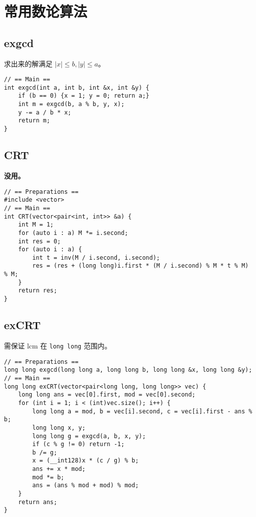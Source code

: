 \section{常用数论算法}

\subsection{exgcd}

求出来的解满足 $|x| \le b, |y| \le a$。

\begin{verbatim}
// == Main ==
int exgcd(int a, int b, int &x, int &y) {
    if (b == 0) {x = 1; y = 0; return a;}
    int m = exgcd(b, a % b, y, x);
    y -= a / b * x;
    return m;
}
\end{verbatim}

\subsection{CRT}

\textbf{没用。}

\begin{verbatim}
// == Preparations ==
#include <vector>
// == Main ==
int CRT(vector<pair<int, int>> &a) {
    int M = 1;
    for (auto i : a) M *= i.second;
    int res = 0;
    for (auto i : a) {
        int t = inv(M / i.second, i.second);
        res = (res + (long long)i.first * (M / i.second) % M * t % M) % M;
    }
    return res;
}
\end{verbatim}

\subsection{exCRT}

需保证 $\mathrm{lcm}$ 在 \lstinline|long long| 范围内。

\begin{verbatim}
// == Preparations ==
long long exgcd(long long a, long long b, long long &x, long long &y);
// == Main ==
long long exCRT(vector<pair<long long, long long>> vec) {
    long long ans = vec[0].first, mod = vec[0].second;
    for (int i = 1; i < (int)vec.size(); i++) {
        long long a = mod, b = vec[i].second, c = vec[i].first - ans % b;
        long long x, y;
        long long g = exgcd(a, b, x, y);
        if (c % g != 0) return -1;
        b /= g;
        x = (__int128)x * (c / g) % b;
        ans += x * mod;
        mod *= b;
        ans = (ans % mod + mod) % mod;
    }
    return ans;
}
\end{verbatim}

